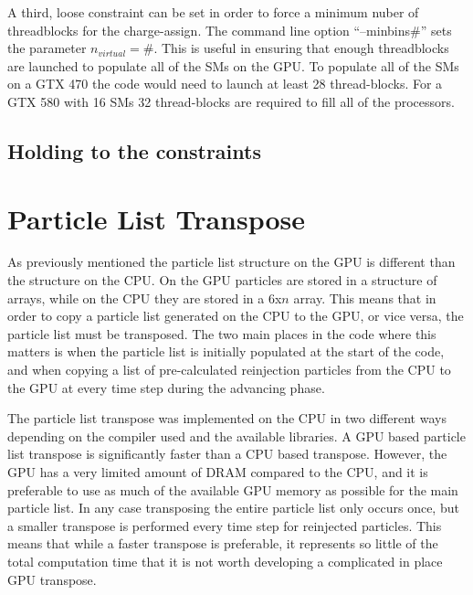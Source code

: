 A third, loose constraint can be set in order to force a minimum nuber of threadblocks for the charge-assign. The command line option ``--minbins\#'' sets the parameter $n_{virtual} = \#$. This is useful in ensuring that enough threadblocks are launched to populate all of the SMs on the GPU. To populate all of the SMs on a GTX 470 the code would need to launch at least 28 thread-blocks. For a GTX 580 with 16 SMs 32 thread-blocks are required to fill all of the processors.  
		\subsection{Holding to the constraints}

	\section{Particle List Transpose}
As previously mentioned the particle list structure on the GPU is different than the structure on the CPU. On the GPU particles are stored in a structure of arrays, while on the CPU they are stored in a 6x$n$ array. This means that in order to copy a particle list generated on the CPU to the GPU, or vice versa, the particle list must be transposed. The two main places in the code where this matters is when the particle list is initially populated at the start of the code, and when copying a list of pre-calculated reinjection particles from the CPU to the GPU at every time step during the advancing phase.

The particle list transpose was implemented on the CPU in two different ways depending on the compiler used and the available libraries. A GPU based particle list transpose is significantly faster than a CPU based transpose. However, the GPU has a very limited amount of DRAM compared to the CPU, and it is preferable to use as much of the available GPU memory as possible for the main particle list. In any case transposing the entire particle list only occurs once, but a smaller transpose is performed every time step for reinjected particles. This means that while a faster transpose is preferable, it represents so little of the total computation time that it is not worth developing a complicated in place GPU transpose.  

